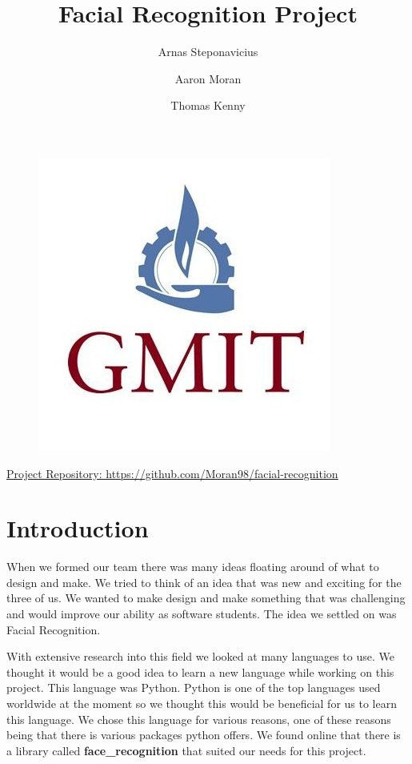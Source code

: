 \documentclass{article}
\begin{document}
\title{Facial Recognition Project}
\begin{figure}
    \centering
    \includegraphics[scale = 0.25]{gmit}
    \label{fig:gmit}
\end{figure}
\author{Arnas Steponavicius
        \and Aaron Moran
        \and Thomas Kenny}
\maketitle
\underline{Project Repository: \url{https://github.com/Moran98/facial-recognition}}
\tableofcontents
\newpage
\section{Introduction}
When we formed our team there was many ideas floating around of what to design and make. We tried to think of an idea that was new and exciting for the three of us. We wanted to make design and make something that was challenging and would improve our ability as software students. The idea we settled on was Facial Recognition. 
    
With extensive research into this field we looked at many languages to use. We thought it would be a good idea to learn a new language while working on this project. This language was Python. 
Python is one of the top languages used worldwide at the moment so we thought this would be beneficial for us to learn this language. We chose this language for various reasons, one of these reasons being that there is various packages python offers. We found online that there is a library called \textbf{face\_recognition} that suited our needs for this project. 
\end{document}
